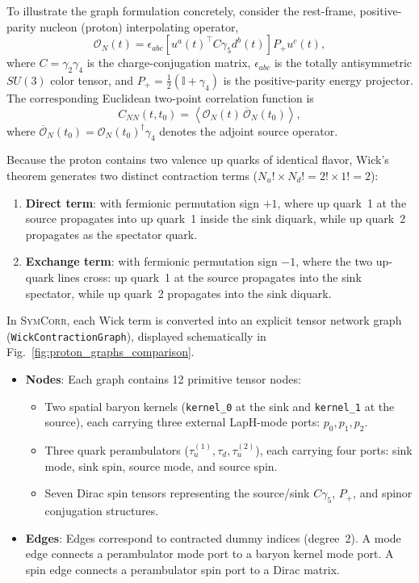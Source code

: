 \documentclass[a4paper,fleqn]{cas-dc}
\begin{document}
To illustrate the graph formulation concretely, consider the rest-frame, positive-parity nucleon (proton) interpolating operator,
\begin{equation}
\mathcal O_N(t) = \epsilon_{abc} \left[ u^a(t)^\top C\gamma_5 d^b(t) \right] P_+ u^c(t),
\label{eq:proton_interpolator_def}
\end{equation}
where \(C = \gamma_2\gamma_4\) is the charge-conjugation matrix, \(\epsilon_{abc}\) is the totally antisymmetric \(SU(3)\) color tensor, and \(P_+ = \frac{1}{2}(\mathbb I + \gamma_4)\) is the positive-parity energy projector. The corresponding Euclidean two-point correlation function is
\begin{equation}
C_{NN}(t, t_0) = \left\langle \mathcal O_N(t) \, \overline{\mathcal O}_N(t_0) \right\rangle,
\label{eq:proton_correlator_def}
\end{equation}
where \(\overline{\mathcal O}_N(t_0) = \mathcal O_N(t_0)^\dagger \gamma_4\) denotes the adjoint source operator.

Because the proton contains two valence up quarks of identical flavor, Wick's theorem generates two distinct contraction terms (\(N_u! \times N_d! = 2! \times 1! = 2\)):
\begin{enumerate}
    \item \textbf{Direct term}: with fermionic permutation sign \(+1\), where up quark~1 at the source propagates into up quark~1 inside the sink diquark, while up quark~2 propagates as the spectator quark.
    \item \textbf{Exchange term}: with fermionic permutation sign \(-1\), where the two up-quark lines cross: up quark~1 at the source propagates into the sink spectator, while up quark~2 propagates into the sink diquark.
\end{enumerate}



In \textsc{SymCorr}, each Wick term is converted into an explicit tensor network graph (\texttt{WickContractionGraph}), displayed schematically in Fig.~\ref{fig:proton_graphs_comparison}.
\begin{itemize}
    \item \textbf{Nodes}: Each graph contains 12 primitive tensor nodes:
    \begin{itemize}
        \item Two spatial baryon kernels (\texttt{kernel\_0} at the sink and \texttt{kernel\_1} at the source), each carrying three external LapH-mode ports: \(p_0, p_1, p_2\).
        \item Three quark perambulators (\(\tau_u^{(1)}, \tau_d, \tau_u^{(2)}\)), each carrying four ports: sink mode, sink spin, source mode, and source spin.
        \item Seven Dirac spin tensors representing the source/sink \(C\gamma_5\), \(P_+\), and spinor conjugation structures.
    \end{itemize}
    \item \textbf{Edges}: Edges correspond to contracted dummy indices (degree~2). A mode edge connects a perambulator mode port to a baryon kernel mode port. A spin edge connects a perambulator spin port to a Dirac matrix.
\end{itemize}
\end{document}
